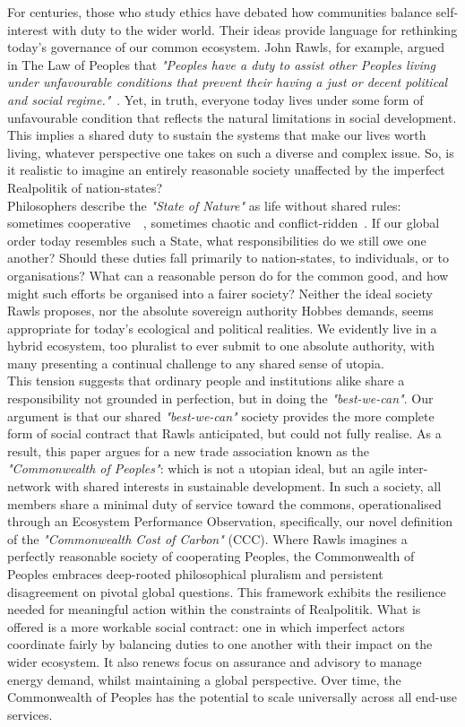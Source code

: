 \documentclass[12pt, oneside]{article}   	%
\begin{document}
For centuries, those who study ethics have debated how communities balance self-interest with duty to the wider world.
Their ideas provide language for rethinking today’s governance of our common ecosystem.
John Rawls, for example, argued in The Law of Peoples that \emph{"Peoples have a duty to assist other Peoples living under unfavourable conditions that prevent their having a just or decent political and social regime."}~\cite{jr2}.
Yet, in truth, everyone today lives under some form of unfavourable condition that reflects the natural limitations in social development.
This implies a shared duty to sustain the systems that make our lives worth living, whatever perspective one takes on such a diverse and complex issue.
So, is it realistic to imagine an entirely reasonable society unaffected by the imperfect Realpolitik of nation-states?\\

Philosophers describe the \emph{"State of Nature"} as life without shared rules: sometimes cooperative~\cite{jl1}~\cite{rn1}, sometimes chaotic and conflict-ridden~\cite{th1}.
If our global order today resembles such a State, what responsibilities do we still owe one another?
Should these duties fall primarily to nation-states, to individuals, or to organisations?
What can a reasonable person do for the common good, and how might such efforts be organised into a fairer society?
Neither the ideal society Rawls proposes, nor the absolute sovereign authority Hobbes demands, seems appropriate for today’s ecological and political realities.
We evidently live in a hybrid ecosystem, too pluralist to ever submit to one absolute authority, with many presenting a continual challenge to any shared sense of utopia.\\

This tension suggests that ordinary people and institutions alike share a responsibility not grounded in perfection, but in doing the \emph{"best-we-can"}.
Our argument is that our shared \emph{"best-we-can"} society provides the more complete form of social contract that Rawls anticipated, but could not fully realise.
As a result, this paper argues for a new trade association known as the \emph{"Commonwealth of Peoples"}: which is not a utopian ideal, but an agile inter-network with shared interests in sustainable development.
In such a society, all members share a minimal duty of service toward the commons, operationalised through an Ecosystem Performance Observation, specifically, our novel definition of the \emph{"Commonwealth Cost of Carbon"} (CCC).
Where Rawls imagines a perfectly reasonable society of cooperating Peoples, the Commonwealth of Peoples embraces deep-rooted philosophical pluralism and persistent disagreement on pivotal global questions.
This framework exhibits the resilience needed for meaningful action within the constraints of Realpolitik.
What is offered is a more workable social contract: one in which imperfect actors coordinate fairly by balancing duties to one another with their impact on the wider ecosystem.
It also renews focus on assurance and advisory to manage energy demand, whilst maintaining a global perspective.
Over time, the Commonwealth of Peoples has the potential to scale universally across all end-use services.\\
\end{document}
